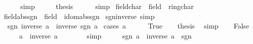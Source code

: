 \begin{isabellebody}
\ \ \ \ \isamarkupfalse%
\ simp\isanewline
\ \ \isamarkupfalse%
\ \isamarkupfalse%
\ {\isacharquery}{\kern0pt}thesis\isanewline
\ \ \ \ \isamarkupfalse%
\ simp\isanewline
{}\isamarkupfalse%
%
\endisatagproof
{\isafoldproof}%
%
\isadelimproof
\isanewline
%
\endisadelimproof
\isanewline
{}\isamarkupfalse%
\isanewline
\isanewline
{}\isamarkupfalse%
\ field{\isacharunderscore}{\kern0pt}char{\isacharunderscore}{\kern0pt}{}\ {\isacharequal}{\kern0pt}\ field\ {\isacharplus}{\kern0pt}\ ring{\isacharunderscore}{\kern0pt}char{\isacharunderscore}{\kern0pt}{}%
\isadelimdocument
%
\endisadelimdocument
%
\isatagdocument
%
\isamarkuptrue%
%
\endisatagdocument
{\isafolddocument}%
%
\isadelimdocument
%
\endisadelimdocument
{}\isamarkupfalse%
\ field{\isacharunderscore}{\kern0pt}abs{\isacharunderscore}{\kern0pt}sgn\ {\isacharequal}{\kern0pt}\ field\ {\isacharplus}{\kern0pt}\ idom{\isacharunderscore}{\kern0pt}abs{\isacharunderscore}{\kern0pt}sgn\isanewline
{}\isanewline
\isanewline
{}\isamarkupfalse%
\ sgn{\isacharunderscore}{\kern0pt}inverse\ {\isacharbrackleft}{\kern0pt}simp{\isacharbrackright}{\kern0pt}{\isacharcolon}{\kern0pt}\isanewline
\ \ {\isachardoublequoteopen}sgn\ {\isacharparenleft}{\kern0pt}inverse\ a{\isacharparenright}{\kern0pt}\ {\isacharequal}{\kern0pt}\ inverse\ {\isacharparenleft}{\kern0pt}sgn\ a{\isacharparenright}{\kern0pt}{\isachardoublequoteclose}\isanewline
%
\isadelimproof
%
\endisadelimproof
%
\isatagproof
{}\isamarkupfalse%
\ {\isacharparenleft}{\kern0pt}cases\ {\isachardoublequoteopen}a\ {\isacharequal}{\kern0pt}\ {}{\isachardoublequoteclose}{\isacharparenright}{\kern0pt}\isanewline
\ \ \isamarkupfalse%
\ True\ \isamarkupfalse%
\ \isamarkupfalse%
\ {\isacharquery}{\kern0pt}thesis\ \isamarkupfalse%
\ simp\isanewline
{}\isamarkupfalse%
\isanewline
\ \ \isamarkupfalse%
\ False\isanewline
\ \ \isamarkupfalse%
\ \isamarkupfalse%
\ {\isachardoublequoteopen}a\ {\isacharasterisk}{\kern0pt}\ inverse\ a\ {\isacharequal}{\kern0pt}\ {}{\isachardoublequoteclose}\isanewline
\ \ \ \ \isamarkupfalse%
\ simp\isanewline
\ \ \isamarkupfalse%
\ \isamarkupfalse%
\ {\isachardoublequoteopen}sgn\ {\isacharparenleft}{\kern0pt}a\ {\isacharasterisk}{\kern0pt}\ inverse\ a{\isacharparenright}{\kern0pt}\ {\isacharequal}{\kern0pt}\ sgn\ {}{\isachardoublequoteclose}\isanewline

\end{isabellebody}
